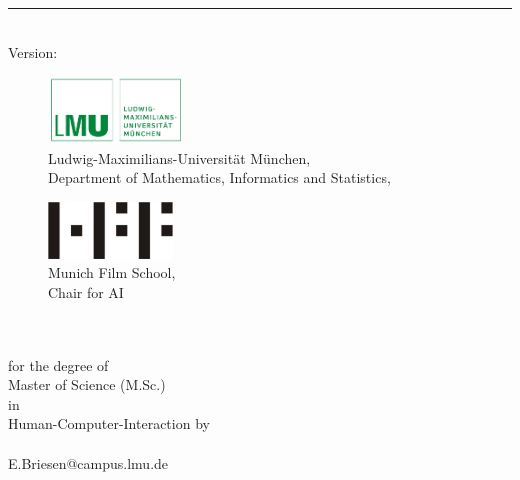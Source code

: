 %
\begin{titlepage}
	\flushright
	\hfill
	\vfill
	{\LARGE\thesisTitle \par}
	\rule[5pt]{\textwidth}{.4pt} \par
	{\Large\thesisName}
	\vfill
	\textit{\large\thesisDate} \\
	Version: \thesisVersion
\end{titlepage}


\begin{titlepage}
	\tgherosfont
	
	
	\begin{figure}
	\begin{minipage}[t]{8.5cm}		
	\includegraphics[height=1.8cm,width=3.6cm]{gfx/lmulogo.pdf}\\
	\textsf{\small{
		Ludwig-Maximilians-Universität München, \\	
		Department of Mathematics, Informatics and Statistics, \\
		\thesisUniversityInstitute
	}}
	\end{minipage}
	\hfill
	\begin{minipage}[t]{3.7cm}
	\includegraphics[height=1.5cm]{gfx/hff-logo-small.jpeg}\\
	\textsf{\small{Munich Film School, \\ Chair for AI}}
	\end{minipage}
	\end{figure}
	
	\centering


	\vfill
	{\Large \thesisSubject} \\[5mm]
	{\LARGE \color{ctcolortitle}\textbf{\thesisTitle} \\[10mm]}
	{for the degree of} \\[3mm] 
	{\Large Master of Science (M.Sc.)} \\[3mm]
	{in}\\[3mm]
	{\Large Human-Computer-Interaction}
	\vfill
	{by} \\ [3mm]
	{\Large \thesisName} \\ [3mm]
	{E.Briesen@campus.lmu.de} \\


\end{titlepage}
